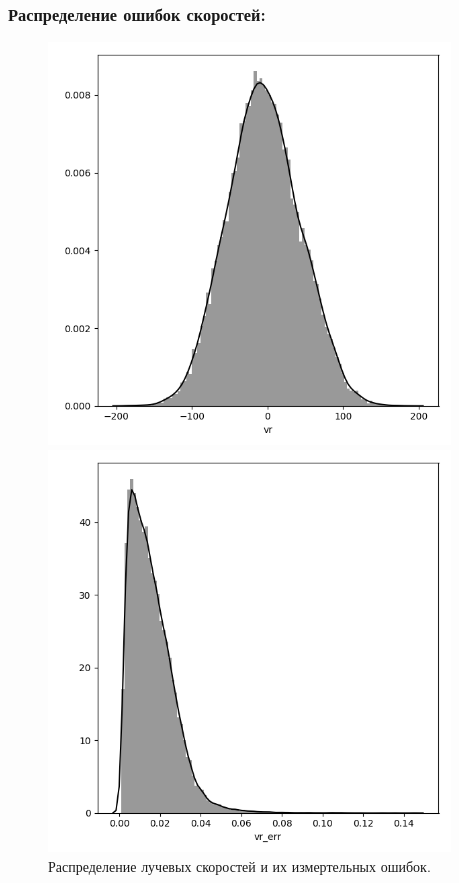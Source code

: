 \documentclass{matmex-diploma-custom}
\begin{document}
\subsubsection*{Распределение ошибок скоростей:}
\begin{figure}[h!]
\begin{minipage}[h]{0.49\linewidth}
        \includegraphics[width=0.95\textwidth]{../imgs/vr_distr.png}
\end{minipage}
\hfill
\begin{minipage}[h]{0.49\linewidth}
        \includegraphics[width=0.95\textwidth]{../imgs/vr_err_distr.png}
\end{minipage}
\caption{Распределение лучевых скоростей и их измертельных ошибок.}
\end{figure}
\end{document}
